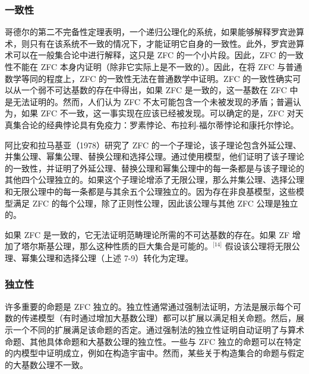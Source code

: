 \subsubsection{一致性} 
哥德尔的第二不完备性定理表明，一个递归公理化的系统，如果能够解释罗宾逊算术，则只有在该系统不一致的情况下，才能证明它自身的一致性。此外，罗宾逊算术可以在一般集合论中进行解释，这只是 ZFC 的一个小片段。因此，ZFC 的一致性不能在 ZFC 本身内证明（除非它实际上是不一致的）。因此，在将 ZFC 与普通数学等同的程度上，ZFC 的一致性无法在普通数学中证明。ZFC 的一致性确实可以从一个弱不可达基数的存在中得出，如果 ZFC 是一致的，这一基数在 ZFC 中是无法证明的。然而，人们认为 ZFC 不太可能包含一个未被发现的矛盾；普遍认为，如果 ZFC 不一致，这一事实现在应该已经被发现。可以确定的是，ZFC 对天真集合论的经典悖论具有免疫力：罗素悖论、布拉利-福尔蒂悖论和康托尔悖论。

阿比安和拉马基亚（1978）研究了 ZFC 的一个子理论，该子理论包含外延公理、并集公理、幂集公理、替换公理和选择公理。通过使用模型，他们证明了该子理论的一致性，并证明了外延公理、替换公理和幂集公理中的每一条都是与该子理论的其他四个公理独立的。如果这个子理论增添了无限公理，那么并集公理、选择公理和无限公理中的每一条都是与其余五个公理独立的。因为存在非良基模型，这些模型满足 ZFC 的每个公理，除了正则性公理，因此该公理与其他 ZFC 公理是独立的。

如果 ZFC 是一致的，它无法证明范畴理论所需的不可达基数的存在。如果 ZF 增加了塔尔斯基公理，那么这种性质的巨大集合是可能的。\(^\text{[14]}\) 假设该公理将无限公理、幂集公理和选择公理（上述 7-9）转化为定理。
\subsubsection{独立性} 
许多重要的命题是 ZFC 独立的。独立性通常通过强制法证明，方法是展示每个可数的传递模型（有时通过增加大基数公理）都可以扩展以满足相关命题。然后，展示一个不同的扩展满足该命题的否定。通过强制法的独立性证明自动证明了与算术命题、其他具体命题和大基数公理的独立性。一些与 ZFC 独立的命题可以在特定的内模型中证明成立，例如在构造宇宙中。然而，某些关于构造集合的命题与假定的大基数公理不一致。

